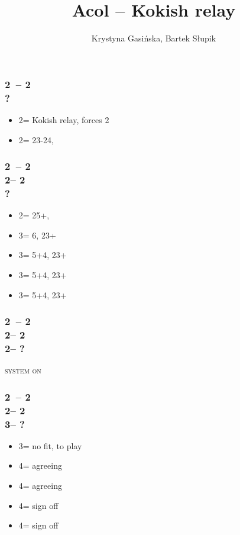 \documentclass[12pt, a4paper]{article}
\title{Acol -- Kokish relay}
\author{Krystyna Gasińska, Bartek Słupik}
\begin{document}
\maketitle


\subsubsection*{2\clubs\ -- 2\diams \\ ?}
\begin{itemize}
    \item 2\hearts = Kokish relay, forces 2\spades
    \item 2\nt = 23-24, \bal
\end{itemize}

\subsubsection*{2\clubs\ -- 2\diams \\ 
                2\hearts -- 2\spades \\ ?}
\begin{itemize}
    \item 2\nt = 25+, \bal
    \item 3\clubs = 6\hearts, 23+
    \item 3\diams = 5\hearts+4\diams, 23+
    \item 3\hearts = 5\hearts+4\clubs, 23+
    \item 3\spades = 5\hearts+4\spades, 23+
\end{itemize}

\subsubsection*{2\clubs\ -- 2\diams \\ 
                2\hearts -- 2\spades \\
                2\nt -- ?}
\textsc{system on}

\subsubsection*{2\clubs\ -- 2\diams \\ 
                2\hearts -- 2\spades \\
                3\spades -- ?}
\begin{itemize}
    \item 3\nt = no fit, to play
    \item 4\clubs = agreeing \hearts
    \item 4\diams = agreeing \spades
    \item 4\hearts = sign off
    \item 4\spades = sign off
\end{itemize}

\end{document}
